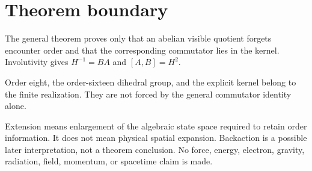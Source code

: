 \section{Theorem boundary}

The general theorem proves only that an abelian visible quotient
forgets encounter order and that the corresponding commutator lies in
the kernel. Involutivity gives \(H^{-1}=BA\) and \([A,B]=H^2\).

Order eight, the order-sixteen dihedral group, and the explicit kernel
belong to the finite realization. They are not forced by the general
commutator identity alone.

Extension means enlargement of the algebraic state space required to
retain order information. It does not mean physical spatial
expansion. Backaction is a possible later interpretation, not a
theorem conclusion. No force, energy, electron, gravity, radiation,
field, momentum, or spacetime claim is made.
